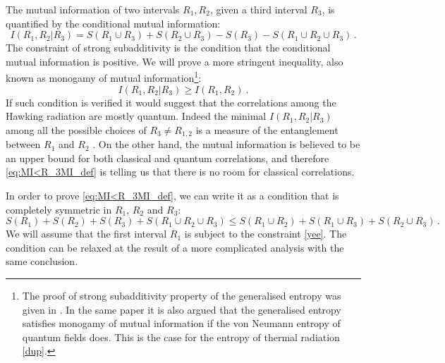 \documentclass[12pt]{article}
\begin{document}
The mutual information of two intervals $R_1,R_2$, given a third interval $R_3$,  is quantified by the conditional mutual information: 
\begin{equation}
\label{eq:R_3MI_def}
I(R_1,R_2|R_3)= S(R_1 \cup R_3)+S(R_2 \cup R_3)-S(R_3)-S(R_1\cup R_2 \cup R_3) \, .
\end{equation}
The constraint of strong subadditivity is the condition that the conditional mutual information is positive. We will prove a more stringent inequality, also known as monogamy of mutual information\footnote{The proof of strong subadditivity property of the generalised entropy was given in \cite{Akers:2019lzs}. In the same paper it is also argued that the generalised entropy satisfies monogamy of mutual information if the von Neumann entropy of quantum fields does. This is the case for the entropy of thermal radiation \eqref{dup}.}:
\begin{equation}
\label{eq:MI<R_3MI_def}
I(R_1,R_2|R_3)\ge I(R_1,R_2)\ .
\end{equation} 
If such condition is verified it would suggest that the correlations among the Hawking radiation are mostly quantum. Indeed the minimal $I(R_1,R_2|R_3)$ among all the possible choices of $R_3 \neq R_{1,2}$ is a measure of the entanglement between $R_1$ and $R_2$ \cite{CW}. On the other hand, the mutual information is believed to be an upper bound for both classical and quantum correlations, and therefore \eqref{eq:MI<R_3MI_def} is telling us that there is no room for classical correlations.


In order to prove \eqref{eq:MI<R_3MI_def}, we can write it as a condition that is completely symmetric in $R_1$, $R_2$ and $R_3$:
\begin{equation}
\label{eq:MI<CMI}
S(R_1)+S(R_2)+S(R_3)+S(R_1\cup R_2 \cup R_3) \le S(R_1 \cup R_2)+S(R_1 \cup R_3)+S(R_2 \cup R_3) \, .
\end{equation}
We will assume that the first interval $R_1$ is subject to the constraint \eqref{yee}. The condition can be relaxed at the result of a more complicated analysis with the same conclusion.
\end{document}
